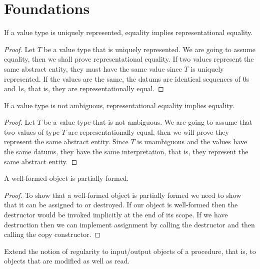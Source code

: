 
\chapter{Foundations}

\begin{lemma}
	If a value type is uniquely represented, equality implies representational equality.
\end{lemma}

\begin{proof}
	Let $T$ be a value type that is uniquely represented. We are going to assume equality,
	then we shall prove representational equality. If two values represent the same abstract entity,
	they must have the same value since $T$ is uniquely represented. If the values are the same, the datums
	are identical sequences of 0s and 1s, that is, they are representationally equal.
\end{proof}

\begin{lemma}
	If a value type is not ambiguous, representational equality implies equality.
\end{lemma}

\begin{proof}
	Let $T$ be a value type that is not ambiguous. We are going to assume that two values of type $T$ are
	representationally equal, then we will prove they represent the same abstract entity. Since $T$ is
	unambiguous and the values have the same datums, they have the same interpretation, that is, they
	represent the same abstract entity.
\end{proof}

\begin{lemma}
	A well-formed object is partially formed.
\end{lemma}

\begin{proof}
	To show that a well-formed object is partially formed we need to show that it can be assigned to
	or destroyed. If our object is well-formed then the destructor would be invoked implicitly at the
	end of its scope. If we have destruction then we can implement assignment by calling the destructor
	and then calling the copy constructor.
\end{proof}

\begin{exercise}
	Extend the notion of regularity to input/output objects of a procedure, that is, to objects that are
	modified as well as read.
\end{exercise}

